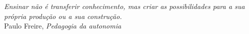 \begin{epigrafe}
    \vspace*{\fill}
    \begin{flushright}
        \begin{minipage}{.6\textwidth}
        \raggedleft
        \textit{Ensinar não é transferir conhecimento, mas criar as possibilidades para a sua própria produção ou a sua construção.}\\[0.3cm]
        Paulo Freire, \textit{Pedagogia da autonomia}
        \end{minipage}
    \end{flushright}
\end{epigrafe}
